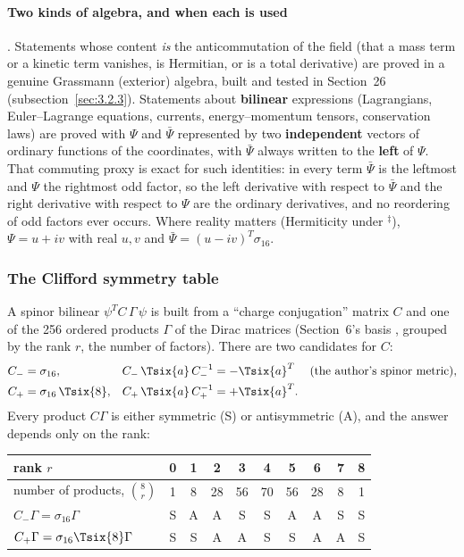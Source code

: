 \paragraph{Two kinds of algebra, and when each is used} . Statements whose content
\emph{is} the anticommutation of the field (that a mass term or a kinetic term vanishes, is
Hermitian, or is a total derivative) are proved in a genuine Grassmann (exterior) algebra, built and
tested in Section~26 (subsection~\ref{sec:3.2.3}). Statements about \textbf{bilinear} expressions
(Lagrangians, Euler--Lagrange equations, currents, energy--momentum tensors, conservation laws) are
proved with $\Psi$ and $\bar\Psi$ represented by two \textbf{independent} vectors of ordinary
functions of the coordinates, with $\bar\Psi$ always written to the \textbf{left} of $\Psi$. That
commuting proxy is exact for such identities: in every term $\bar\Psi$ is the leftmost and $\Psi$
the rightmost odd factor, so the left derivative with respect to $\bar\Psi$ and the right
derivative with respect to $\Psi$ are the ordinary derivatives, and no reordering of odd factors
ever occurs. Where reality matters (Hermiticity under ${}^{\ddagger}$), $\Psi=u+iv$ with real $u,v$
and $\bar\Psi=(u-iv)^{T}\sigma_{16}$.

\subsubsection{The Clifford symmetry table}
\label{sec:3.2.1}

A spinor bilinear $\psi^{T}C\,\Gamma\,\psi$ is built from a ``charge conjugation'' matrix $C$ and
one of the 256 ordered products $\Gamma$ of the Dirac matrices (Section~6's basis ,
grouped by the rank $r$, the number of factors). There are two candidates for $C$:
\begin{align*}
  C_- &= \sigma_{16}, & C_-\,\Tsix{a}\,C_-^{-1} &= -\Tsix{a}^{T} &&\text{(the author's spinor metric)},\\
  C_+ &= \sigma_{16}\,\Tsix{8}, & C_+\,\Tsix{a}\,C_+^{-1} &= +\Tsix{a}^{T} .
\end{align*}
Every product $C\Gamma$ is either symmetric (S) or antisymmetric (A), and the answer depends only
on the rank:

\begin{center}
\begin{tabular}{@{}lccccccccc@{}}
\toprule
rank $r$ & 0 & 1 & 2 & 3 & 4 & 5 & 6 & 7 & 8 \\
\midrule
number of products, $\binom{8}{r}$ & 1 & 8 & 28 & 56 & 70 & 56 & 28 & 8 & 1 \\
$C_-\Gamma=\sigma_{16}\Gamma$ & S & A & A & S & S & A & A & S & S \\
$C_+\Gamma=\sigma_{16}\Tsix{8}\Gamma$ & S & S & A & A & S & S & A & A & S \\
\bottomrule
\end{tabular}
\end{center}

